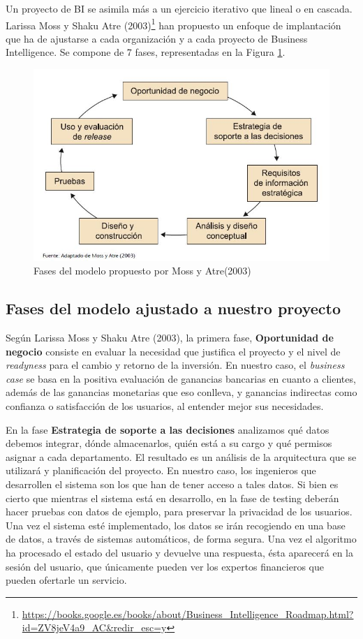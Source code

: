 \documentclass{article}
\begin{document}
Un proyecto de BI se asimila más a un ejercicio iterativo que lineal o en cascada. Larissa Moss y Shaku Atre (2003)\footnote{\url{https://books.google.es/books/about/Business_Intelligence_Roadmap.html?id=ZV8jeV4a9_AC&redir_esc=y}} han propuesto un enfoque de implantación que ha de ajustarse a cada organización y a cada proyecto de Business Intelligence. Se compone de 7 fases, representadas en la Figura \ref{Fases}.

\begin{figure}[h]
	\centering
	\includegraphics[scale=0.7]{Fases}
	\caption{Fases del modelo propuesto por Moss y Atre(2003)}
	\label{Fases}
\end{figure}


\subsection{Fases del modelo ajustado a nuestro proyecto}

Según Larissa Moss y Shaku Atre (2003), la primera fase, \textbf{Oportunidad de negocio} consiste en evaluar la necesidad que justifica el proyecto y el nivel de \textit{readyness} para el cambio y retorno de la inversión. En nuestro caso, el \textit{business case} se basa en la positiva evaluación de ganancias bancarias en cuanto a clientes, además de las ganancias monetarias que eso conlleva, y ganancias indirectas como confianza o satisfacción de los usuarios, al entender mejor sus necesidades.

En la fase \textbf{Estrategia de soporte a las decisiones} analizamos qué datos debemos integrar, dónde almacenarlos, quién está a su cargo y qué permisos asignar a cada departamento. El resultado es un análisis de la arquitectura que se utilizará y planificación del proyecto. En nuestro caso, los ingenieros que desarrollen el sistema son los que han de tener acceso a tales datos. Si bien es cierto que mientras el sistema está en desarrollo, en la fase de testing deberán hacer pruebas con datos de ejemplo, para preservar la privacidad de los usuarios. Una vez el sistema esté implementado, los datos se irán recogiendo en una base de datos, a través de sistemas automáticos, de forma segura. Una vez el algoritmo ha procesado el estado del usuario y devuelve una respuesta, ésta aparecerá en la sesión del usuario, que únicamente pueden ver los expertos financieros que pueden ofertarle un servicio.
\end{document}
